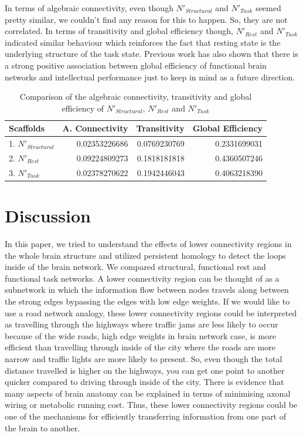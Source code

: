 \documentclass[9pt,twocolumn,twoside,lineno]{pnas-new}
\begin{document}
In terms of algebraic connectivity, even though $N'_{Structural}$ and $N'_{Task}$ seemed pretty similar, we couldn't find any reason for this to happen. So, they are not correlated. In terms of transitivity and global efficiency though, $N'_{Rest}$ and $N'_{Task}$ indicated similar behaviour which reinforces the fact that resting state is the underlying structure of the task state. Previous work has also shown that  there is a strong positive association between global efficiency of functional brain networks and intellectual performance\cite{intellectual} just to keep in mind as a future direction.


\begin{table}%
\centering
\caption{Comparison of the algebraic connectivity, transitivity and global efficiency of $N'_{Structural}$, $N'_{Rest}$ and $N'_{Task}$}
\begin{tabular}{lrrr}
Scaffolds & A. Connectivity & Transitivity & Global Efficiency \\
\midrule
1. $N'_{Structural}$ & 0.02353226686 & 0.0769230769 & 0.2331699031 \\
2. $N'_{Rest}$ & 0.09224809273 & 0.1818181818 & 0.4360507246 \\
3. $N'_{Task}$ & 0.02378270622 & 0.1942446043 & 0.4063218390\\
\bottomrule
\end{tabular}

\end{table}

\section*{Discussion}

In this paper, we tried to understand the effects of lower connectivity regions in the whole brain structure and utilized persistent homology to detect the loops inside of the brain network. We compared structural, functional rest and functional task networks. A lower connectivity region can be thought of as a subnetwork in which the information flow between nodes travels along between the strong edges bypassing the edges with low edge weights. If we would like to use a road network analogy, these lower connectivity regions could be interpreted as travelling through the highways where traffic jams are less likely to occur because of the wide roads, high edge weights in brain network case, is more efficient than travelling through inside of the city where the roads are more narrow and traffic lights are more likely to present. So, even though the total distance travelled is higher on the highways, you can get one point to another quicker compared to driving through inside of the city. There is evidence that many aspects of brain anatomy can be explained in terms of minimising axonal wiring or metabolic running cost\cite{wiringoptim}. Thus, these lower connectivity regions could be one of the mechanisms for efficiently transferring information from one part of the brain to another.
\end{document}
